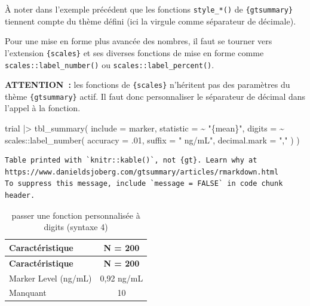 \documentclass[
  letterpaper,
  DIV=11,
  numbers=noendperiod,
  oneside]{scrreprt}
\newenvironment{Shaded}{\begin{snugshade}}{\end{snugshade}}
\newcommand{\AttributeTok}[1]{\textcolor[rgb]{0.40,0.45,0.13}{#1}}
\newcommand{\DecValTok}[1]{\textcolor[rgb]{0.68,0.00,0.00}{#1}}
\newcommand{\FunctionTok}[1]{\textcolor[rgb]{0.28,0.35,0.67}{#1}}
\newcommand{\NormalTok}[1]{\textcolor[rgb]{0.00,0.23,0.31}{#1}}
\newcommand{\SpecialCharTok}[1]{\textcolor[rgb]{0.37,0.37,0.37}{#1}}
\newcommand{\StringTok}[1]{\textcolor[rgb]{0.13,0.47,0.30}{#1}}
\begin{document}
À noter dans l'exemple précédent que les fonctions \texttt{style\_*()}
de \texttt{\{gtsummary\}} tiennent compte du thème défini (ici la
virgule comme séparateur de décimale).

Pour une mise en forme plus avancée des nombres, il faut se tourner vers
l'extension \texttt{\{scales\}} et ses diverses fonctions de mise en
forme comme \texttt{scales::label\_number()} ou
\texttt{scales::label\_percent()}.

\textbf{ATTENTION~:} les fonctions de \texttt{\{scales\}} n'héritent pas
des paramètres du thème \texttt{\{gtsummary\}} actif. Il faut donc
personnaliser le séparateur de décimal dans l'appel à la fonction.

\begin{Shaded}
\begin{Highlighting}[]
\NormalTok{trial }\SpecialCharTok{|\textgreater{}}
  \FunctionTok{tbl\_summary}\NormalTok{(}
    \AttributeTok{include =}\NormalTok{ marker,}
    \AttributeTok{statistic =} \SpecialCharTok{\textasciitilde{}} \StringTok{"\{mean\}"}\NormalTok{,}
    \AttributeTok{digits =} \SpecialCharTok{\textasciitilde{}}\NormalTok{ scales}\SpecialCharTok{::}\FunctionTok{label\_number}\NormalTok{(}
      \AttributeTok{accuracy =}\NormalTok{ .}\DecValTok{01}\NormalTok{, }
      \AttributeTok{suffix =} \StringTok{" ng/mL"}\NormalTok{, }
      \AttributeTok{decimal.mark =} \StringTok{","}
\NormalTok{    )}
\NormalTok{  )}
\end{Highlighting}
\end{Shaded}

\begin{verbatim}
Table printed with `knitr::kable()`, not {gt}. Learn why at
https://www.danieldsjoberg.com/gtsummary/articles/rmarkdown.html
To suppress this message, include `message = FALSE` in code chunk header.
\end{verbatim}

\hypertarget{tbl-digits-6}{}
\begin{longtable}[]{@{}lc@{}}
\caption{\label{tbl-digits-6}passer une fonction personnalisée à digits
(syntaxe 4)}\tabularnewline
\toprule()
\textbf{Caractéristique} & \textbf{N = 200} \\
\midrule()
\endfirsthead
\toprule()
\textbf{Caractéristique} & \textbf{N = 200} \\
\midrule()
\endhead
Marker Level (ng/mL) & 0,92 ng/mL \\
Manquant & 10 \\
\bottomrule()
\end{longtable}
\end{document}
